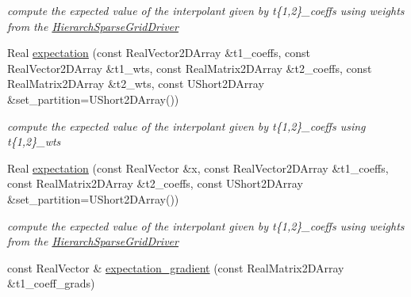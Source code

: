 \begin{DoxyCompactItemize}
\begin{DoxyCompactList}\small\item\em compute the expected value of the interpolant given by t\{1,2\}\+\_\+coeffs using weights from the \hyperlink{classPecos_1_1HierarchSparseGridDriver}{Hierarch\+Sparse\+Grid\+Driver} \end{DoxyCompactList}\item 
Real \hyperlink{classPecos_1_1HierarchInterpPolyApproximation_ac11a36763964807e2496970dd2a7170d}{expectation} (const Real\+Vector2\+D\+Array \&t1\+\_\+coeffs, const Real\+Vector2\+D\+Array \&t1\+\_\+wts, const Real\+Matrix2\+D\+Array \&t2\+\_\+coeffs, const Real\+Matrix2\+D\+Array \&t2\+\_\+wts, const U\+Short2\+D\+Array \&set\+\_\+partition=U\+Short2\+D\+Array())\label{classPecos_1_1HierarchInterpPolyApproximation_ac11a36763964807e2496970dd2a7170d}

\begin{DoxyCompactList}\small\item\em compute the expected value of the interpolant given by t\{1,2\}\+\_\+coeffs using t\{1,2\}\+\_\+wts \end{DoxyCompactList}\item 
Real \hyperlink{classPecos_1_1HierarchInterpPolyApproximation_a025b070b17e6ea1a80bf14b1ab59eeb8}{expectation} (const Real\+Vector \&x, const Real\+Vector2\+D\+Array \&t1\+\_\+coeffs, const Real\+Matrix2\+D\+Array \&t2\+\_\+coeffs, const U\+Short2\+D\+Array \&set\+\_\+partition=U\+Short2\+D\+Array())\label{classPecos_1_1HierarchInterpPolyApproximation_a025b070b17e6ea1a80bf14b1ab59eeb8}

\begin{DoxyCompactList}\small\item\em compute the expected value of the interpolant given by t\{1,2\}\+\_\+coeffs using weights from the \hyperlink{classPecos_1_1HierarchSparseGridDriver}{Hierarch\+Sparse\+Grid\+Driver} \end{DoxyCompactList}\item 
const Real\+Vector \& \hyperlink{classPecos_1_1HierarchInterpPolyApproximation_a923b0e83c2a901b95842cc0f8cdfd038}{expectation\+\_\+gradient} (const Real\+Matrix2\+D\+Array \&t1\+\_\+coeff\+\_\+grads)\label{classPecos_1_1HierarchInterpPolyApproximation_a923b0e83c2a901b95842cc0f8cdfd038}


\end{DoxyCompactItemize}
